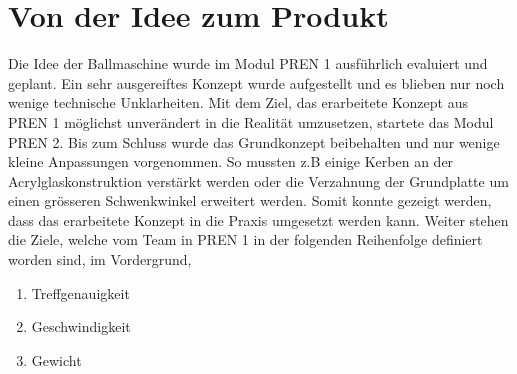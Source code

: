 \section{Von der Idee zum Produkt}
Die Idee der Ballmaschine wurde im Modul PREN 1 ausführlich evaluiert und geplant. 
Ein sehr ausgereiftes Konzept wurde aufgestellt und es blieben nur noch wenige 
technische Unklarheiten. Mit dem Ziel, das erarbeitete Konzept aus PREN 1 möglichst 
unverändert in die Realität umzusetzen, startete das Modul PREN 2.
Bis zum Schluss wurde das Grundkonzept beibehalten und nur wenige kleine Anpassungen 
vorgenommen. So mussten z.B einige Kerben an der Acrylglaskonstruktion verstärkt werden
oder die Verzahnung der Grundplatte um einen grösseren Schwenkwinkel erweitert werden. 
Somit konnte gezeigt werden, dass das erarbeitete Konzept in die Praxis umgesetzt 
werden kann. Weiter stehen die Ziele, welche vom Team in PREN 1 in der folgenden Reihenfolge definiert 
worden sind, im Vordergrund,
\begin{enumerate}
	\item Treffgenauigkeit
	\item Geschwindigkeit
	\item Gewicht
\end{enumerate}